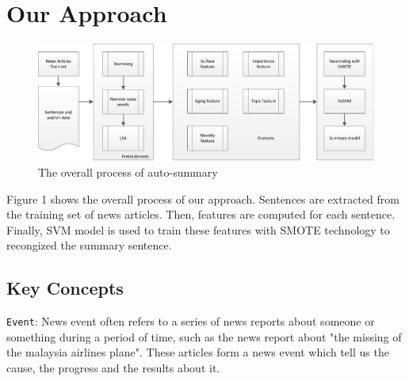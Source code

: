 \documentclass[print]{jicspack}
\begin{document}
%
\section{Our Approach}
%



\begin{figure}[h]
\centering
\includegraphics[angle=0, width=1\textwidth]{summary-process.eps}

\caption{The overall process of auto-summary}
\label{fig:levfig}
\end{figure}





Figure 1 shows the overall process of our approach.
Sentences are extracted from the training set of news articles.
Then, features are computed for each sentence. 
Finally, SVM model is used to train these features with SMOTE technology to recongized the summary sentence.


\subsection{Key Concepts}

\texttt{Event}: News event often refers to a series of news reports about someone or something during a period of time, such as the news report about "the missing of the malaysia airlines plane". These articles form a news event which tell us the cause, the progress and the results about it. 
\end{document}
